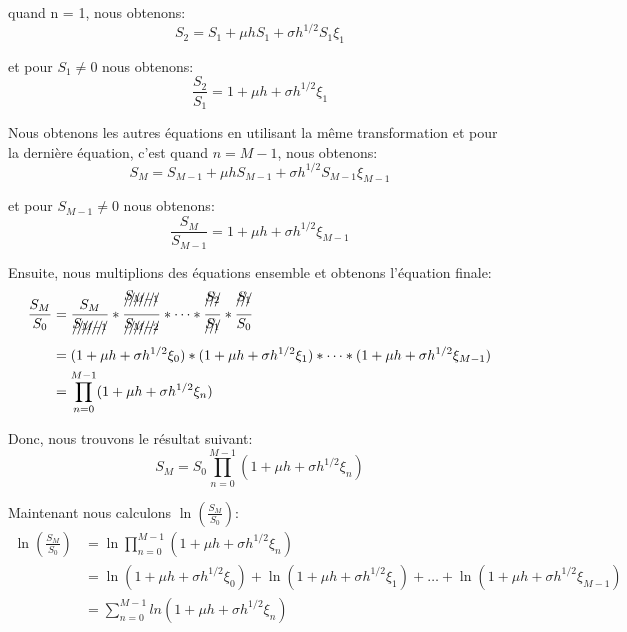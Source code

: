 \documentclass[a4paper,10pt]{report}
\begin{document}
\par quand n = 1, nous obtenons:
\begin{equation}
S_{2} = S_{1} + \mu h S_{1} + \sigma h^{1/2} S_{1} \xi_{1}
\end{equation}
\par et pour $S_{1} \neq 0$ nous obtenons:
\begin{equation}
\frac{S_{2}}{S_{1}} = 1 + \mu h + \sigma h^{1/2} \xi_{1}
\end{equation} 	

\par Nous obtenons les autres équations en utilisant la même transformation et pour la dernière équation, c'est quand $n = M - 1$, nous obtenons:
\begin{equation}
S_{M} = S_{M-1} + \mu h S_{M-1} + \sigma h^{1/2} S_{M-1} \xi_{M-1}
\end{equation}
\par et pour $S_{M-1} \neq 0$ nous obtenons:
\begin{equation}
\frac{S_{M}}{S_{M-1}} = 1 + \mu h + \sigma h^{1/2} \xi_{M-1}
\end{equation}

\par Ensuite, nous multiplions des équations ensemble et obtenons l'équation finale: 
\begin{align*}
	\frac{S_{M}}{S_{0}} &= \frac{S_{M}}{\xout{S_{M-1}}} * \frac{\xout{S_{M-1}}}{\xout{S_{M-2}}} *\dots * \frac{\xout{S_{2}}}{\xout{S_{1}}} * \frac{\xout{S_{1}}}{S_{0}}\\
&= (1 + \mu h + \sigma h^{1/2} \xi_{0}) * (1 + \mu h + \sigma h^{1/2} \xi_{1}) * \dots * (1 + \mu h + \sigma h^{1/2} \xi_{M-1})\\
&= \prod_{n=0}^{M-1} (1 + \mu h + \sigma h^{1/2} \xi_{n})
\end{align*}
 
\par Donc, nous trouvons le résultat suivant:
\begin{equation}
S_{M} = S_{0} \prod_{n=0}^{M-1} (1 + \mu h + \sigma h^{1/2} \xi_{n})
\end{equation}

\par Maintenant nous calculons $\ln(\frac{S_{M}}{S_{0}})$:
\begin{align*}
	\ln(\frac{S_{M}}{S_{0}}) &= \ln \prod_{n=0}^{M-1} (1 + \mu h + \sigma h^{1/2} \xi_{n}) \\
	&= \ln(1 + \mu h + \sigma h^{1/2} \xi_{0}) + \ln(1 + \mu h + \sigma h^{1/2} \xi_{1}) + \dots + \ln(1 + \mu h + \sigma h^{1/2} \xi_{M-1})\\
	&= \sum_{n=0}^{M-1} ln(1  + \mu h + \sigma h^{1/2} \xi_{n})\\	
\end{align*}
\end{document}

